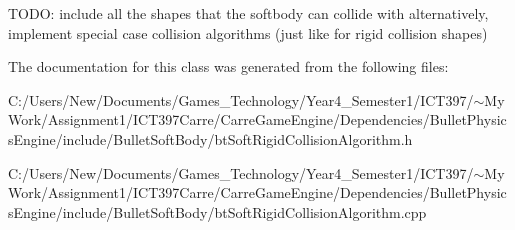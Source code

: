 TODO: include all the shapes that the softbody can collide with alternatively, implement special case collision algorithms (just like for rigid collision shapes) 

The documentation for this class was generated from the following files:\begin{CompactItemize}
\item 
C:/Users/New/Documents/Games\_\-Technology/Year4\_\-Semester1/ICT397/$\sim$My Work/Assignment1/ICT397Carre/CarreGameEngine/Dependencies/BulletPhysicsEngine/include/BulletSoftBody/btSoftRigidCollisionAlgorithm.h\item 
C:/Users/New/Documents/Games\_\-Technology/Year4\_\-Semester1/ICT397/$\sim$My Work/Assignment1/ICT397Carre/CarreGameEngine/Dependencies/BulletPhysicsEngine/include/BulletSoftBody/btSoftRigidCollisionAlgorithm.cpp\end{CompactItemize}
